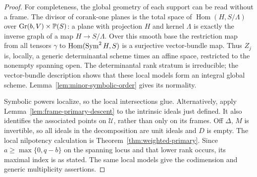 \begin{proof}
For completeness, the global geometry of each support can be read
without a frame. The divisor of corank-one planes is the total space
of $\operatorname{Hom}(H,S/\Lambda)$ over
$\operatorname{Gr}(b,V)\times\mathbb P(S)$: a plane with projection $H$ and kernel
$\Lambda$ is exactly the inverse graph of a map $H\to S/\Lambda$.
Over this smooth base the restriction map from all tensors $\gamma$
to $\operatorname{Hom}(\operatorname{Sym}^2H,S)$ is a surjective vector-bundle map.
Thus $Z_j$ is, locally, a generic determinantal scheme times an
affine space, restricted to the nonempty spanning open. The
determinantal rank stratum is irreducible; the vector-bundle
description shows that these local models form an integral global
scheme. Lemma~\ref{lem:minor-symbolic-order} gives its normality.

Symbolic powers localize, so the local intersections glue.
Alternatively, apply Lemma~\ref{lem:frame-primary-descent} to the
intrinsic ideals just defined. It also identifies the associated
points on $\mathscr U$, rather than only on its frames.
Off $\Delta$, $M$ is invertible, so all ideals in the decomposition
are unit ideals and $D$ is empty. The local nilpotency calculation
is Theorem~\ref{thm:weighted-primary}. Since
$a\ge\max\{0,q-b\}$ on the spanning locus and that lower rank
occurs, its maximal index is as stated. The same local models give
the codimension and generic multiplicity assertions.
\end{proof}

